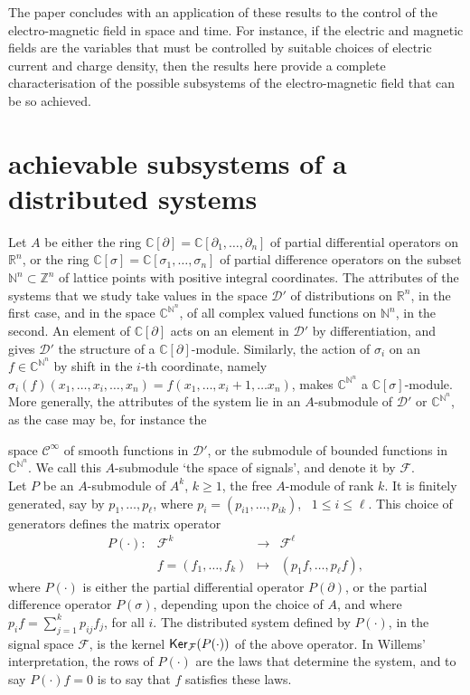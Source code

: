 \documentclass[11pt]{amsart}
\def\ker{\mathop{\sf Ker}}
\def\Cinf{\mathcal{C}^\infty}
\def\Dr{\mathcal{D}'}
\def\C{\mathbb{C}}
\def\N{\mathbb{N}}
\def\R{\mathbb{R}}
\newcommand{\del}{\partial}
\newcommand{\pde}{[\partial_1, \ldots ,\partial_n]}
\newcommand{\diff}{[\sigma_1, \ldots ,\sigma_n]}
\newcommand{\F}{\mathcal{F}}
\begin{document}
The paper concludes with an application of these results to the control of the electro-magnetic field in space and time. For instance, if the electric and magnetic fields are the variables that must be controlled by suitable choices of electric current and charge density, then the results here provide a complete characterisation of 
the possible subsystems of the electro-magnetic field that can be so achieved.
 
\section{achievable subsystems of a  distributed systems} 
 
Let $A$ be either the ring $\C[\partial] = \C\pde$ of partial differential operators on $\R^n$, or the ring $\C[\sigma] = \C\diff$ of partial difference operators on the subset $\N^n \subset \mathbb{Z}^n$ of lattice points with positive integral coordinates. The attributes of the systems that we study take values in the space $\Dr$ of distributions on $\R^n$, in the first case, and in the space $\C^{\N^n}$, of all complex valued functions on $\N^n$, in the second. An element of $\C[\partial]$ acts on an element in $\Dr$ by differentiation, and gives $\Dr$ the structure of a $\C[\partial]$-module. Similarly, the action of $\sigma_i$ on an $f \in \C^{\N^n}$ by shift in the $i$-th coordinate, namely $\sigma_i(f)(x_1,\ldots, x_i, \ldots, x_n) = f(x_1, \ldots, x_i+1, \ldots x_n)$, makes $\C^{\N^n}$ a $\C[\sigma]$-module. More generally, the attributes of the system lie in an $A$-submodule of $\Dr$ or $ \C^{\N^n}$, as the case may be, for instance the{ space $\Cinf$ of smooth functions in $\Dr$, or the submodule of bounded functions in $\C^{\N^n}$. We call this $A$-submodule `the space of signals', and denote it by $\F$.\\

Let $P$ be an $A$-submodule of $A^k$, $k \geqslant 1$, the free $A$-module of rank $k$. It is finitely generated, say by $p_1, \ldots, p_\ell$, where $p_i = (p_{i1}, \ldots, p_{ik})$, ~$1 \leqslant i \leqslant \ell$. This choice of generators defines the matrix operator
\[
\begin{array}{cccc}
P(\cdot): & \F^k  & \longrightarrow & \F^\ell\\
& f=(f_1, \ldots, f_k) & \mapsto &  (p_1f, \ldots, p_\ell f) ,
 \end{array}
\]
where $P(\cdot)$ is either the partial differential operator $P(\del)$, or the partial difference operator $P(\sigma)$, depending upon the choice of $A$, and  where $p_if = \sum_{j=1}^k p_{ij}f_j$, for all $i$. The distributed system defined by $P(\cdot)$, in the signal space $\F$, is the kernel $\ker_{\F}(P(\cdot))$ of the above operator.
In Willems' interpretation, the rows of $P(\cdot)$ are the laws that determine the system, and to say $P(\cdot)f = 0$ is to say that $f$ satisfies these laws.

}
\end{document}
